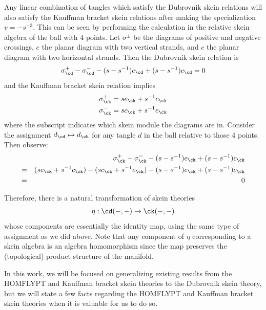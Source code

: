 \begin{remark} \label{rmk:naturaltransformation}
Any linear combination of tangles which satisfy the Dubrovnik skein relations will also satisfy the Kauffman bracket skein relations after making the specialization $v=-s^{-3}$. This can be seen by performing the calculation in the relative skein algebra of the ball with $4$ points. Let $\sigma^\pm$ be the diagrams of positive and negative crossings, $e$ the planar diagram with two vertical strands, and $c$ the planar diagram with two horizontal strands. Then the Dubrovnik skein relation is
\[
\sigma^+_\cd - \sigma^-_\cd - (s-s^{-1})e_\cd + (s-s^{-1})c_\cd = 0
\]
and the Kauffman bracket skein relation implies
\begin{align*}
\sigma^+_\ck &= se_\ck + s^{-1}c_\ck \\
\sigma^-_\ck &= sc_\ck + s^{-1}e_\ck
\end{align*}
where the subscript indicates which skein module the diagrams are in. Consider the assignment $d_\cd \mapsto d_\ch$ for any tangle $d$ in the ball relative to those $4$ points. Then observe:
\begin{eqnarray*}
& &\sigma^+_\ck - \sigma^-_\ck - (s-s^{-1})e_\ck + (s-s^{-1})c_\ck \\
=& &(se_\ck + s^{-1}c_\ck) - (sc_\ck + s^{-1}e_\ck) - (s-s^{-1})e_\ck + (s-s^{-1})c_\ck \\
=& &0
\end{eqnarray*}

Therefore, there is a natural transformation of skein theories 
\[
\eta: \cd(-,-) \to \ck(-,-)
\] 
whose components are essentially the identity map, using the same type of assignment as we did above. Note that any component of $\eta$ corresponding to a skein algebra is an algebra homomorphism since the map preserves the (topological) product structure of the manifold.
\end{remark}

In this work, we will be focused on generalizing existing results from the HOMFLYPT and Kauffman bracket skein theories to the Dubrovnik skein theory, but we will state a few facts regarding the HOMFLYPT and Kauffman bracket skein theories when it is valuable for us to do so. 


